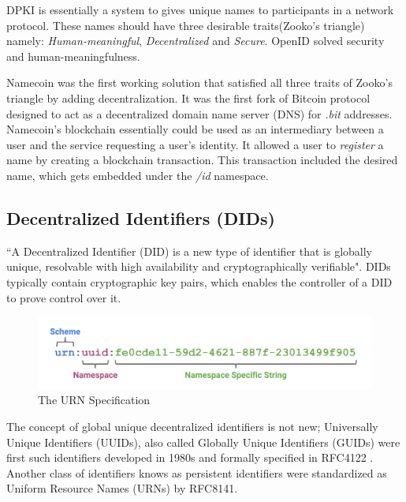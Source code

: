 		DPKI is essentially a system to gives unique names to participants in a network protocol. These names should have three desirable traits(Zooko's triangle) namely: \textit{Human-meaningful}, \textit{Decentralized} and \textit{Secure}. OpenID solved security and human-meaningfulness.
		
		Namecoin\cite{dpki:namecoin:1} was the first working solution that satisfied all three traits of Zooko's triangle by adding decentralization. It was the first fork of Bitcoin\cite{nakamoto2008bitcoin} protocol designed to act as a decentralized domain name server (DNS) for \textit{.bit} addresses. Namecoin's blockchain essentially could be used as an intermediary between a user and the service requesting a user's identity\cite{raval2016decentralized}. It allowed a user to \textit{register} a name by creating a blockchain transaction. This transaction included the desired name, which gets embedded under the \textit{/id} namespace.
		
	\subsection{Decentralized Identifiers (DIDs)}
		``A Decentralized Identifier (DID) is a new type of identifier that is globally unique, resolvable with high availability and cryptographically verifiable"\cite{did:spec:0:13}. DIDs typically contain cryptographic key pairs, which enables the controller of a DID to prove control over it.
		
		\begin{figure}[h]
			\includegraphics[width=\linewidth]{figures/urn-format}
			\caption{\label{fig:urn-format} The URN Specification\protect\cite{image:urn:did:1}}
		\end{figure}
	
		The concept of global unique decentralized identifiers is not new; Universally Unique Identifiers (UUIDs), also called Globally Unique Identifiers (GUIDs) were first such identifiers developed in 1980s and formally specified in RFC4122 \cite{rfc4122}. Another class of identifiers knows as persistent identifiers were standardized as Uniform Resource Names (URNs) by RFC8141\cite{rfc8141}.
		
